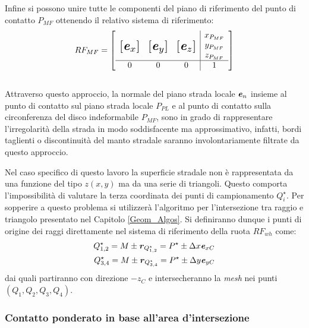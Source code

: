 Infine si possono unire tutte le componenti del piano di riferimento del punto di contatto $P_{MF}$ ottenendo il relativo sistema di riferimento:
%
\begin{equation}
RF_{MF} = \left[
\begin{array}{ccc|c}
& & & x_{P_{MF}}\\
\multirow{3}{*}{\raisebox{20mm}{\scalebox{1.5}{$\left[\textbf{\textit{e}}_x\right]$}}} & \multirow{3}{*}{\raisebox{20mm}{\scalebox{1.5}{$\left[\textbf{\textit{e}}_y\right]$}}} & \multirow{3}{*}{\raisebox{20mm}{\scalebox{1.5}{$\left[\textbf{\textit{e}}_z\right]$}}} & y_{P_{MF}}\\
& & & z_{P_{MF}}\\ \hline
0 & 0 & 0 & 1
\end{array}\right]
\end{equation}\\
Attraverso questo approccio, la normale del piano strada locale $\textbf{\textit{e}}_{n}$ insieme al punto di contatto sul piano strada locale $P_{PL}$ e al punto di contatto sulla circonferenza del disco indeformabile $P_{MF}$, sono in grado di rappresentare l'irregolarità della strada in modo soddisfacente ma approssimativo, infatti, bordi taglienti o discontinuità del manto stradale saranno involontariamente filtrate da questo approccio.

Nel caso specifico di questo lavoro la superficie stradale non è rappresentata da una funzione del tipo $z(x,y)$ ma da una serie di triangoli. Questo comporta l'impossibilità di valutare la terza coordinata dei punti di campionamento $Q_i^\star$. Per sopperire a questo problema si utilizzerà l'algoritmo per l'intersezione tra raggio e triangolo presentato nel Capitolo \ref{Geom_Algos}. Si definiranno dunque i punti di origine dei raggi direttamente nel sistema di riferimento della ruota $RF_{wh}$ come:
\begin{equation}
\begin{split}
Q^\star_{1,2} = M \pm \textbf{\textit{r}}_{Q^\star_{1,2}} = P^\star \pm \Delta x \textbf{\textit{e}}_{xC} \\
Q^\star_{3,4} = M \pm \textbf{\textit{r}}_{Q^\star_{3,4}} = P^\star \pm \Delta y \textbf{\textit{e}}_{yC}
\end{split}
\end{equation}
dai quali partiranno con direzione $-z_C$ e intersecheranno la \textit{mesh} nei punti $(Q_1, Q_2, Q_3, Q_4)$.
%
\subsubsection{Contatto ponderato in base all'area d'intersezione}
%

